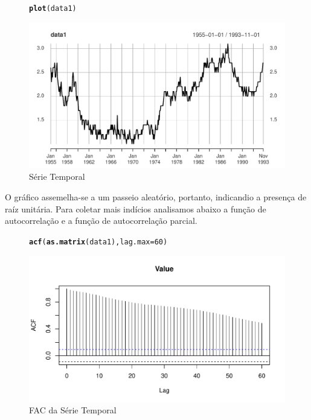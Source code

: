 \documentclass{article}\usepackage[]{graphicx}\usepackage[]{color}
\makeatletter
\def\maxwidth{ %
  \ifdim\Gin@nat@width>\linewidth
    \linewidth
  \else
    \Gin@nat@width
  \fi
}
\newcommand{\hlnum}[1]{\textcolor[rgb]{0.686,0.059,0.569}{#1}}%
\newcommand{\hlstd}[1]{\textcolor[rgb]{0.345,0.345,0.345}{#1}}%
\newcommand{\hlkwc}[1]{\textcolor[rgb]{0.333,0.667,0.333}{#1}}%
\newcommand{\hlkwd}[1]{\textcolor[rgb]{0.737,0.353,0.396}{\textbf{#1}}}%
\newenvironment{kframe}{%
 \def\at@end@of@kframe{}%
 \ifinner\ifhmode%
  \def\at@end@of@kframe{\end{minipage}}%
  \begin{minipage}{\columnwidth}%
 \fi\fi%
 \def\FrameCommand##1{\hskip\@totalleftmargin \hskip-\fboxsep
 \colorbox{shadecolor}{##1}\hskip-\fboxsep
     \hskip-\linewidth \hskip-\@totalleftmargin \hskip\columnwidth}%
 \MakeFramed {\advance\hsize-\width
   \@totalleftmargin\z@ \linewidth\hsize
   \@setminipage}}%
 {\par\unskip\endMakeFramed%
 \at@end@of@kframe}
\newenvironment{knitrout}{}{} %
\makeatother
\begin{document}
            \begin{figure}[H]
            \caption{Série Temporal}
            \centering
\begin{knitrout}
\color{fgcolor}\begin{kframe}
\begin{alltt}
\hlkwd{plot}\hlstd{(data1)}
\end{alltt}
\end{kframe}
\includegraphics[width=\maxwidth]{figure/unnamed-chunk-29-1} 

\end{knitrout}
            \end{figure}
            
            O gráfico assemelha-se a um passeio aleatório, portanto, indicandio a presença de raíz unitária. Para coletar mais indícios analisamos abaixo a função de autocorrelação e a função de autocorrelação parcial.
            
            \begin{figure}[H]
            \caption{FAC da Série Temporal}
            \centering
\begin{knitrout}
\color{fgcolor}\begin{kframe}
\begin{alltt}
\hlkwd{acf}\hlstd{(}\hlkwd{as.matrix}\hlstd{(data1),} \hlkwc{lag.max}\hlstd{=}\hlnum{60}\hlstd{)}
\end{alltt}
\end{kframe}
\includegraphics[width=\maxwidth]{figure/unnamed-chunk-30-1} 

\end{knitrout}
            \end{figure}
            
\end{document}
